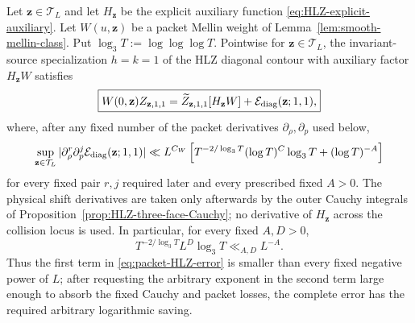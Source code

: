 \begin{lemma}
\label{lem:packet-HLZ-diagonal}
Let $\mathbf z\in\mathcal T_L$ and let $H_{\mathbf z}$ be the explicit
auxiliary function \eqref{eq:HLZ-explicit-auxiliary}.  Let
$W(u,\mathbf z)$ be a packet Mellin weight of
Lemma~\ref{lem:smooth-mellin-class}. Put
$\log_3T:=\log\log\log T$.  Pointwise for
$\mathbf z\in\mathcal T_L$, the invariant-source specialization $h=k=1$ of the
HLZ diagonal contour with auxiliary factor $H_{\mathbf z}W$ satisfies
\begin{equation}
\boxed{
W(0,\mathbf z)Z_{\mathbf z,1,1}
=\widetilde Z_{\mathbf z,1,1}[H_{\mathbf z}W]
+\mathcal E_{\rm diag}(\mathbf z;1,1),
}
\label{eq:packet-HLZ-diagonal}
\end{equation}
where, after any fixed number of the packet derivatives
$\partial_\rho,\partial_p$ used below,
\begin{equation}
\sup_{\mathbf z\in\mathcal T_L}
|\partial_\rho^r\partial_p^j\mathcal E_{\rm diag}(\mathbf z;1,1)|
\ll L^{C_W}
\left[
T^{-2/\log_3T}
(\log T)^C\log_3T+(\log T)^{-A}
\right]
\label{eq:packet-HLZ-error}
\end{equation}
for every fixed pair $r,j$ required later and every prescribed fixed $A>0$.  The physical shift derivatives are taken
only afterwards by the outer Cauchy integrals of
Proposition~\ref{prop:HLZ-three-face-Cauchy}; no derivative of
$H_{\mathbf z}$ across the collision locus is used.
In particular, for every fixed $A,D>0$,
\begin{equation}
\boxed{
T^{-2/\log_3T}L^D\log_3T\ll_{A,D}L^{-A}.
}
\label{eq:HLZ-superlog-saving}
\end{equation}
Thus the first term in \eqref{eq:packet-HLZ-error} is smaller than every fixed
negative power of $L$; after requesting the arbitrary exponent in the second
term large enough to absorb the fixed Cauchy and packet losses, the complete
error has the required arbitrary logarithmic saving.
\end{lemma}

